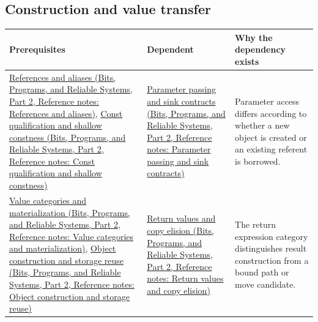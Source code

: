 \subsection{Construction and value transfer}\label{appendix-4ad47bdd269a-construction-and-value-transfer}

\hypertarget{appendix-4ad47bdd269a-construction-and-value-transfer}{}

{\def\LTcaptype{none} %
\begin{longtable}[]{@{}
  >{\raggedright\arraybackslash}p{}
  >{\raggedright\arraybackslash}p{}
  >{\raggedright\arraybackslash}p{}@{}}
\toprule\noalign{}
\begin{minipage}[b]{\linewidth}\raggedright
Prerequisites
\end{minipage} & \begin{minipage}[b]{\linewidth}\raggedright
Dependent
\end{minipage} & \begin{minipage}[b]{\linewidth}\raggedright
Why the dependency exists
\end{minipage} \\
\midrule\noalign{}
\endhead
\bottomrule\noalign{}
\endlastfoot
\href{../01-Bits-Programs-and-Reliable-Systems-P02/main.pdf\#appendix-d6d562ca9fbb}{References and aliases (Bits, Programs, and Reliable Systems, Part 2, Reference notes: References and aliases)}, \href{../01-Bits-Programs-and-Reliable-Systems-P02/main.pdf\#appendix-c25d60fed375}{Const qualification and shallow constness (Bits, Programs, and Reliable Systems, Part 2, Reference notes: Const qualification and shallow constness)} & \href{../01-Bits-Programs-and-Reliable-Systems-P02/main.pdf\#appendix-d5908f75721f}{Parameter passing and sink contracts (Bits, Programs, and Reliable Systems, Part 2, Reference notes: Parameter passing and sink contracts)} & Parameter access differs according to whether a new object is created or an existing referent is borrowed. \\
\href{../01-Bits-Programs-and-Reliable-Systems-P02/main.pdf\#appendix-1121b30eaeb0}{Value categories and materialization (Bits, Programs, and Reliable Systems, Part 2, Reference notes: Value categories and materialization)}, \href{../01-Bits-Programs-and-Reliable-Systems-P02/main.pdf\#appendix-a82f9c438857}{Object construction and storage reuse (Bits, Programs, and Reliable Systems, Part 2, Reference notes: Object construction and storage reuse)} & \href{../01-Bits-Programs-and-Reliable-Systems-P02/main.pdf\#appendix-b08d3788c5c6}{Return values and copy elision (Bits, Programs, and Reliable Systems, Part 2, Reference notes: Return values and copy elision)} & The return expression category distinguishes result construction from a bound path or move candidate. \\

\end{longtable}}
